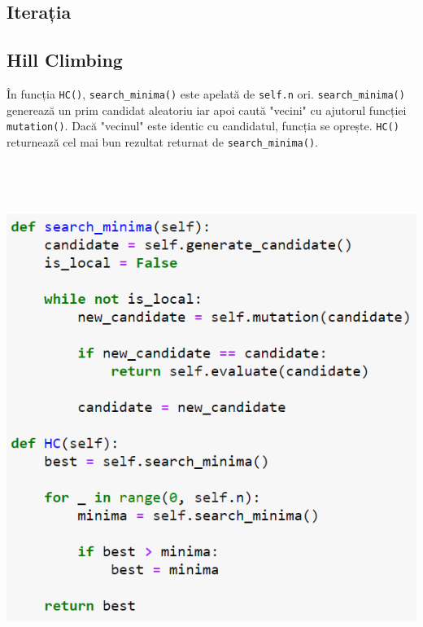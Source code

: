 \documentclass{article}
\begin{document}
\subsection{Iterația}
\subsection*{Hill Climbing}
În funcția \texttt{HC()}, \texttt{search\_minima()} este apelată de \texttt{self.n} ori. \texttt{search\_minima()} generează un prim candidat aleatoriu iar apoi caută "vecini" cu ajutorul funcției \texttt{mutation()}. Dacă "vecinul" este identic cu candidatul, funcția se oprește. \texttt{HC()} returnează cel mai bun rezultat returnat de \texttt{search\_minima()}.\\\\\\\\\\
\includegraphics[width=\textwidth]{3i}\\\\
\end{document}

